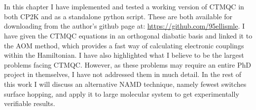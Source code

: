 \\\\
In this chapter I have implemented and tested a working version of CTMQC in both CP2K and as a standalone python script. These are both available for downloading from the author's github page at: \href{https://github.com/95ellismle}{https://github.com/95ellismle}. I have given the CTMQC equations in an orthogonal diabatic basis and linked it to the AOM method, which provides a fast way of calculating electronic couplings within the Hamiltonian. I have also highlighted what I believe to be the largest problems facing CTMQC. However, as these problems may require an entire PhD project in themselves, I have not addressed them in much detail. In the rest of this work I will discuss an alternative NAMD technique, namely fewest switches surface hopping, and apply it to large molecular system to get experimentally verifiable results.



